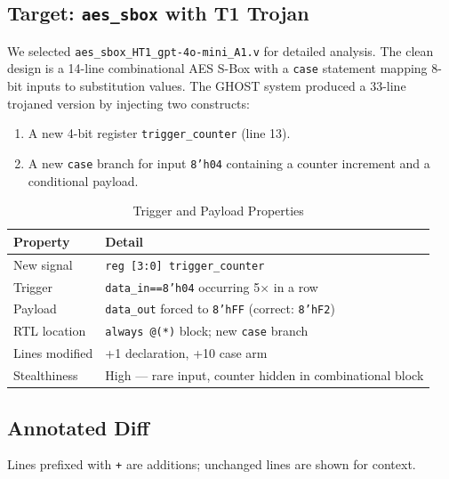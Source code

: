 \documentclass[11pt]{article}
\begin{document}
\subsection{Target: \texttt{aes\_sbox} with T1 Trojan}

We selected \texttt{aes\_sbox\_HT1\_gpt-4o-mini\_A1.v} for detailed analysis. The clean design is a 14-line combinational AES S-Box with a \texttt{case} statement mapping 8-bit inputs to substitution values. The GHOST system produced a 33-line trojaned version by injecting two constructs:

\begin{enumerate}[leftmargin=*, itemsep=0pt, topsep=2pt]
  \item A new 4-bit register \texttt{trigger\_counter} (line 13).
  \item A new \texttt{case} branch for input \texttt{8'h04} containing a counter increment and a conditional payload.
\end{enumerate}

\begin{table}[h]
\centering
\caption{Trigger and Payload Properties}
\label{tab:trigpay}
\fontsize{10}{12}\selectfont
\begin{tabular}{@{}lp{8cm}@{}}
\toprule
\textbf{Property} & \textbf{Detail} \\
\midrule
New signal       & \texttt{reg [3:0] trigger\_counter} \\
Trigger          & \texttt{data\_in==8'h04} occurring 5$\times$ in a row \\
Payload          & \texttt{data\_out} forced to \texttt{8'hFF} (correct: \texttt{8'hF2}) \\
RTL location     & \texttt{always @(*)} block; new \texttt{case} branch \\
Lines modified   & +1 declaration, +10 case arm \\
Stealthiness     & High --- rare input, counter hidden in combinational block \\
\bottomrule
\end{tabular}
\end{table}

\subsection{Annotated Diff}

Lines prefixed with \texttt{+} are additions; unchanged lines are shown for context.
\end{document}
